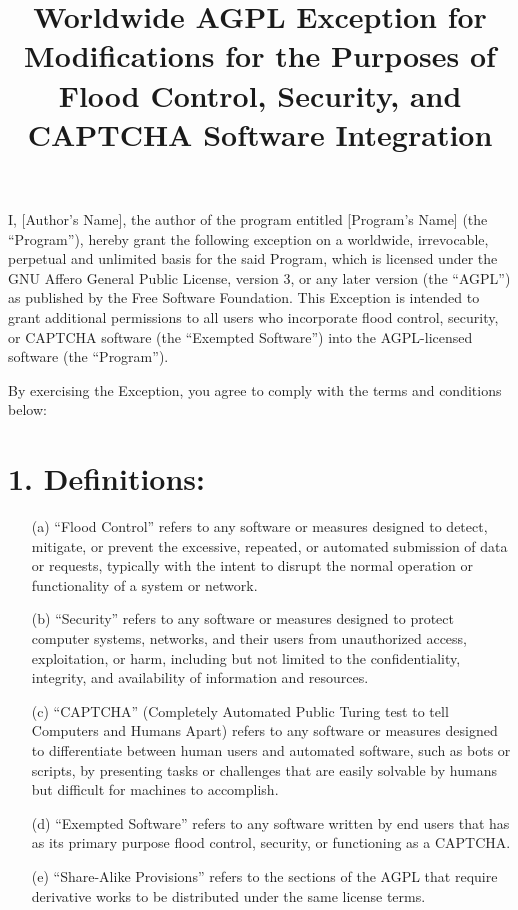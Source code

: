 \documentclass[12pt]{article}
\title{Worldwide AGPL Exception for Modifications for the Purposes of Flood Control, Security, and CAPTCHA Software Integration}
\author{}
\date{}
\begin{document}
\maketitle

I, [Author's Name], the author of the program entitled [Program's Name] (the ``Program''), hereby grant the following exception on a worldwide, irrevocable, perpetual and unlimited basis for the said Program, which is licensed under the GNU Affero General Public License, version 3, or any later version (the ``AGPL'') as published by the Free Software Foundation. This Exception is intended to grant additional permissions to all users who incorporate flood control, security, or CAPTCHA software (the ``Exempted Software'') into the AGPL-licensed software (the ``Program'').

By exercising the Exception, you agree to comply with the terms and conditions below:

\section*{1. Definitions:}
\begin{enumerate}
\item[(a)] ``Flood Control'' refers to any software or measures designed to detect, mitigate, or prevent the excessive, repeated, or automated submission of data or requests, typically with the intent to disrupt the normal operation or functionality of a system or network.

\item[(b)] ``Security'' refers to any software or measures designed to protect computer systems, networks, and their users from unauthorized access, exploitation, or harm, including but not limited to the confidentiality, integrity, and availability of information and resources.

\item[(c)] ``CAPTCHA'' (Completely Automated Public Turing test to tell Computers and Humans Apart) refers to any software or measures designed to differentiate between human users and automated software, such as bots or scripts, by presenting tasks or challenges that are easily solvable by humans but difficult for machines to accomplish.

\item[(d)] ``Exempted Software'' refers to any software written by end users that has as its primary purpose flood control, security, or functioning as a CAPTCHA.

\item[(e)] ``Share-Alike Provisions'' refers to the sections of the AGPL that require derivative works to be distributed under the same license terms.
\end{enumerate}
\end{document}
